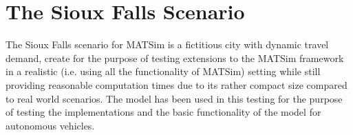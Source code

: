 \section{The Sioux Falls Scenario}
\label{sec:sioux}

The Sioux Falls scenario for MATSim \citep{Chakirov2014} is a fictitious city
with dynamic travel demand, create for the purpose of testing extensions to the
MATSim framework in a realistic (i.e. using all the functionality of MATSim) setting
while still providing reasonable computation times due to its rather compact size
compared to real world scenarios. The model has been used in this testing for the
purpose of testing the implementations and the basic functionality of the model
for autonomous vehicles.
